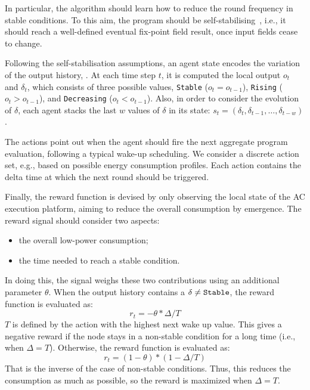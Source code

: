 In particular, the algorithm should learn how to reduce the round frequency in stable conditions. 
 To this aim, the program should be self-stabilising~\cite{DBLP:journals/tomacs/ViroliABDP18}, 
 i.e., it should reach a well-defined eventual fix-point field result, once input fields cease to change.

 Following the self-stabilisation assumptions, an agent state encodes the variation of the output history, .
 At each time step $t$, it is computed the local output $o_t$ and $\delta_t$, which consists of three possible values, \texttt{Stable} ($o_t = o_{t-1}$), \texttt{Rising} ($o_t > o_{t-1}$), and \texttt{Decreasing} ($o_ t < o_{t-1}$).
Also, in order to consider the evolution of $\delta$, each agent stacks the last $w$ values of $\delta$ in its state: $s_t =(\delta_t, \delta_{t-1}, \dots, \delta_{t-w})$.

The actions point out when the agent should fire the next aggregate program evaluation, following a typical wake-up scheduling.
%
We consider a discrete action set, e.g., based on possible energy consumption profiles.
% 
Each action contains the delta time at which the next round should be triggered. 

Finally, the reward function is devised by only observing the local state of the \ac{AC} execution platform, aiming to reduce the overall consumption by emergence.
%
The reward signal should consider two aspects: \begin{itemize}
    \item the overall low-power consumption;
    \item the time needed to reach a stable condition.
\end{itemize} 
In doing this, the signal weighs these two contributions using an additional parameter $\theta$.
 When the output history contains a $\delta \neq \text{\texttt{Stable}}$, the reward function is evaluated as:
\begin{equation}
r_t = - \theta * \Delta / T
\end{equation}
$T$ is defined by the action with the highest next wake up value.
%
This gives a negative reward if the node stays in a non-stable condition for a long time (i.e., when $\Delta = T$).
Otherwise, the reward function is evaluated as:
\begin{equation}
r_t = (1 - \theta) * (1 - \Delta / T)
\end{equation}
That is the inverse of the case of non-stable conditions. 
 Thus, this reduces the consumption as much as possible, so the reward is maximized when $\Delta = T$.

